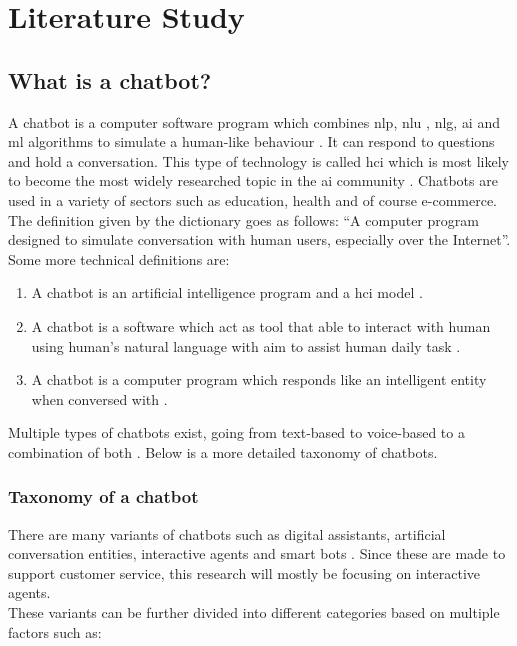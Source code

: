 \mainmatter
\pagestyle{headings}

\chapter{Literature Study}
\label{ch:literature-study}

\section{What is a chatbot?}
A chatbot is a computer software program which combines \acrfull{nlp}, \acrfull{nlu} , \acrfull{nlg}, \acrfull{ai} and \acrfull{ml} algorithms to simulate a human-like behaviour \citep{Adamopoulou2020}. It can respond to questions and hold a conversation. This type of technology is called \acrfull{hci} \citep{Adamopoulou2020} which is most likely to become the most widely researched topic in the \acrshort{ai} community \citep{Bansal2018}. Chatbots are used in a variety of sectors such as education, health and of course e-commerce.\\
\break
The definition given by the dictionary goes as follows: “A computer program designed to simulate conversation with human users, especially over the Internet”\citep{Lexico2022}. Some more technical definitions are:
\begin{enumerate}
	\setlength\itemsep{-0.1em}
	\item A chatbot is an artificial intelligence program and a \acrfull{hci} model \citep{Bansal2018}.
	\item A chatbot is a software which act as tool that able to interact with human using human’s natural language with aim to assist human daily task \citep{Muizzah2021}.
	\item A chatbot  is  a  computer  program  which  responds  like  an  intelligent  entity when  conversed  with \citep{Khanna2015}.
\end{enumerate}
Multiple types of chatbots exist, going from text-based to voice-based to a combination of both \citep{Radziwil2021}. Below is a more detailed taxonomy of chatbots.

\subsection{Taxonomy of a chatbot}
There are many variants of chatbots such as digital assistants, artificial conversation entities, interactive agents and smart bots \citep{Adamopoulou2020}. Since these are made to support customer service, this research will mostly be focusing on interactive agents.\\
These variants can be further divided into different categories based on multiple factors such as:

